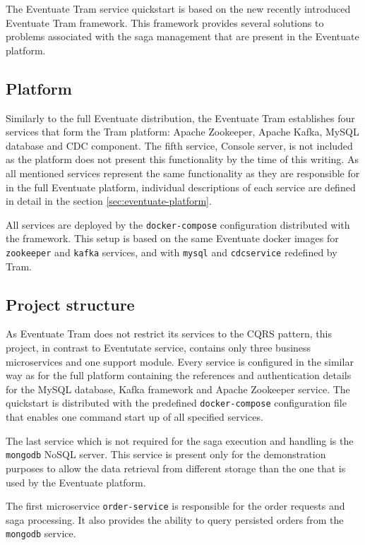 \documentclass[oneside,
  digital, %
  table,   %
  lof,     %
  lot,     %
]{fithesis3}
\begin{document}
The Eventuate Tram service quickstart is based on the new recently introduced Eventuate Tram framework. This framework provides several solutions to problems associated with the saga management that are present in the Eventuate platform.

\subsection{Platform}

Similarly to the full Eventuate distribution, the Eventuate Tram establishes four services that form the Tram platform: Apache Zookeeper, Apache Kafka, MySQL database and CDC component. The fifth service, Console server, is not included as the platform does not present this functionality by the time of this writing. As all mentioned services represent the same functionality as they are responsible for in the full Eventuate platform, individual descriptions of each service are defined in detail in the section \ref{sec:eventuate-platform}.  

All services are deployed by the \texttt{docker-compose} configuration distributed with the framework. This setup is based on the same Eventuate docker images for \texttt{zookeeper} and \texttt{kafka} services, and with \texttt{mysql} and \texttt{cdcservice} redefined by Tram.

\subsection{Project structure}

As Eventuate Tram does not restrict its services to the CQRS pattern, this project, in contrast to Eventutate service, contains only three business microservices and one support module. Every service is configured in the similar way as for the full platform containing the references and authentication details for the MySQL database, Kafka framework and Apache Zookeeper service. The quickstart is distributed with the predefined \texttt{docker-compose} configuration file that enables one command start up of all specified services.

The last service which is not required for the saga execution and handling is the \texttt{mongodb} NoSQL server. This service is present only for the demonstration purposes to allow the data retrieval from different storage than the one that is used by the Eventuate platform.

The first microservice \texttt{order-service} is responsible for the order requests and saga processing. It also provides the ability to query persisted orders from the \texttt{mongodb} service.
\end{document}
